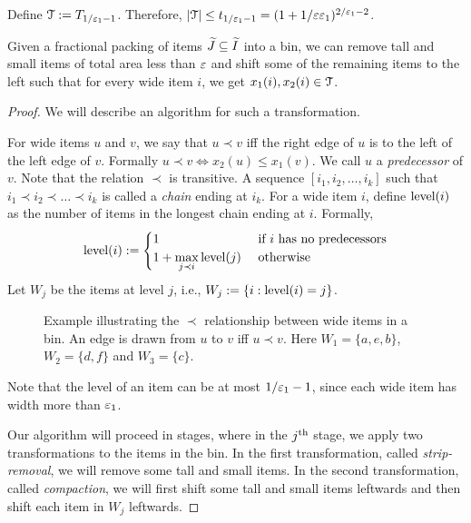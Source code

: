 Define $\mathcal{T} := T_{1/\varepsilon_1-1}$.
Therefore, $|\mathcal{T}| \le t_{1/\varepsilon_1-1} = (1+1/\varepsilon\varepsilon_1)^{2/\varepsilon_1 - 2}$.

\begin{lemma}
\label{thm:disc-hor-pos}
Given a fractional packing of items $\widetilde{J} \subseteq \widetilde{I}$ into a bin,
we can remove tall and small items of total area less than $\varepsilon$
and shift some of the remaining items to the left such that for every wide item $i$,
we get $x_1(i), x_2(i) \in \mathcal{T}$.
\end{lemma}
\begin{proof}
We will describe an algorithm for such a transformation.

For wide items $u$ and $v$, we say that $u \prec v$ iff
the right edge of $u$ is to the left of the left edge of $v$.
Formally $u \prec v \iff x_2(u) \le x_1(v)$.
We call $u$ a \emph{predecessor} of $v$.
Note that the relation $\prec$ is transitive.
A sequence $[i_1, i_2, \ldots, i_k]$ such that $i_1 \prec i_2 \prec \ldots \prec i_k$
is called a \emph{chain} ending at $i_k$.
For a wide item $i$, define $\operatorname{level}(i)$ as the number of items in the longest chain
ending at $i$. Formally,
\[ \operatorname{level}(i) := \begin{cases}
1 & \textrm{ if } i \textrm{ has no predecessors}
\\ \displaystyle 1 + \max_{j \prec i} \operatorname{level}(j) & \textrm{ otherwise}
\end{cases} \]
Let $W_j$ be the items at level $j$, i.e., $W_j := \{i: \operatorname{level}(i) = j\}$.

\begin{figure}[htb]
\centering

\caption[Relation $\prec$ among items in a bin]%
{Example illustrating the $\prec$ relationship between wide items in a bin.
An edge is drawn from $u$ to $v$ iff $u \prec v$.
Here $W_1 = \{a, e, b\}$, $W_2 = \{d, f\}$ and $W_3 = \{c\}$.}
\label{fig:precedence-graph}
\end{figure}

Note that the level of an item can be at most $1/\varepsilon_1-1$,
since each wide item has width more than $\varepsilon_1$.

Our algorithm will proceed in stages, where in the $j^{\textrm{th}}$ stage,
we apply two transformations to the items in the bin.
In the first transformation, called \emph{strip-removal},
we will remove some tall and small items.
In the second transformation, called \emph{compaction},
we will first shift some tall and small items leftwards
and then shift each item in $W_j$ leftwards.


\end{proof}
